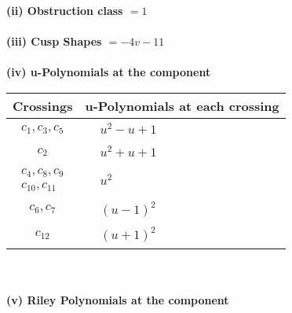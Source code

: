 \documentclass[1p]{elsarticle_modified}
\theoremstyle{definition}
\begin{document}
\flushleft \textbf{(ii) Obstruction class $= 1$}\\~\\
\flushleft \textbf{(iii) Cusp Shapes $= -4 v-11$}\\~\\
\newpage\renewcommand{\arraystretch}{1}
\flushleft \textbf{(iv) u-Polynomials at the component}\newline \\
\begin{tabular}{m{50pt}|m{274pt}}
Crossings & \hspace{64pt}u-Polynomials at each crossing \\
\hline $$\begin{aligned}c_{1},c_{3},c_{5}\end{aligned}$$&$\begin{aligned}
&u^2- u+1
\end{aligned}$\\
\hline $$\begin{aligned}c_{2}\end{aligned}$$&$\begin{aligned}
&u^2+u+1
\end{aligned}$\\
\hline $$\begin{aligned}c_{4},c_{8},c_{9}\\c_{10},c_{11}\end{aligned}$$&$\begin{aligned}
&u^2
\end{aligned}$\\
\hline $$\begin{aligned}c_{6},c_{7}\end{aligned}$$&$\begin{aligned}
&(u-1)^2
\end{aligned}$\\
\hline $$\begin{aligned}c_{12}\end{aligned}$$&$\begin{aligned}
&(u+1)^2
\end{aligned}$\\
\hline
\end{tabular}\\~\\
\newpage\renewcommand{\arraystretch}{1}
\flushleft \textbf{(v) Riley Polynomials at the component}\newline \\
\end{document}
